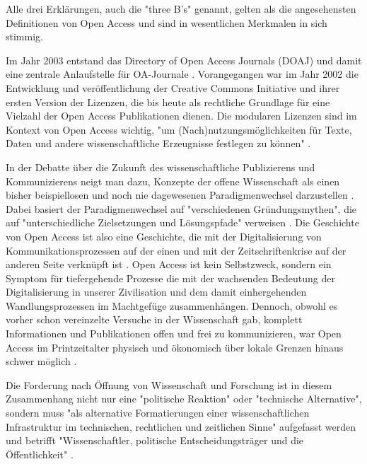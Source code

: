 Alle drei Erklärungen, auch die "three B's"\cite{suber_2004_praising_oa} genannt, gelten als die angesehensten Definitionen von Open Access und sind in wesentlichen Merkmalen in sich stimmig\cite{albert_2006_open_implications}.

Im Jahr 2003 entstand das Directory of Open Access Journals (DOAJ) und damit eine zentrale Anlaufstelle für OA-Journale \cite{suchen-Hoffmann-Zugang-undVerwertung-öffentlicher-Informationen}. Vorangegangen war im Jahr 2002 die Entwicklung und veröffentlichung der Creative Commons Initiative \cite{suchen-Hoffmann-Zugang-undVerwertung-öffentlicher-Informationen} und ihrer ersten Version der Lizenzen, die bis heute als rechtliche Grundlage für eine Vielzahl der Open Access Publikationen dienen\cite{suchen}. Die modularen Lizenzen sind im Kontext von Open Access wichtig, "um (Nach)nutzungsmöglichkeiten für Texte, Daten und andere wissenschaftliche Erzeugnisse festlegen zu können" \cite{suchen-Hoffmann-Zugang-undVerwertung-öffentlicher-Informationen}.

In der Debatte über die Zukunft des wissenschaftliche Publizierens und Kommunizierens neigt man dazu, Konzepte der offene Wissenschaft als einen bisher beispiellosen und noch nie dagewesenen Paradigmenwechsel darzustellen \cite{cite:17a} \cite{cite:17b}. Dabei basiert der Paradigmenwechsel auf "verschiedenen Gründungsmythen", die auf "unterschiedliche Zielsetzungen und Lösungspfade" verweisen \cite{suchen-Hoffmann-Zugang-undVerwertung-öffentlicher-Informationen}. Die Geschichte von Open Access ist also eine Geschichte, die mit der Digitalisierung von Kommunikationsprozessen \cite{albert_2006_open_implications} auf der einen und mit der Zeitschriftenkrise auf der anderen Seite verknüpft ist \cite{suchen-Hoffmann-Zugang-undVerwertung-öffentlicher-Informationen}. Open Access ist kein Selbstzweck\cite{cite:17d}, sondern ein Symptom für tiefergehende Prozesse die mit der wachsenden Bedeutung der Digitalisierung in unserer Zivilisation und dem damit einhergehenden Wandlungsprozessen im Machtgefüge zusammenhängen\cite{cite:17e}. Dennoch, obwohl es vorher schon vereinzelte Versuche in der Wissenschaft gab, komplett Informationen und Publikationen offen und frei zu kommunizieren, war Open Access im Printzeitalter physisch und ökonomisch über lokale Grenzen hinaus schwer möglich \cite{cite:18a}. 

Die Forderung nach Öffnung von Wissenschaft und Forschung ist in diesem Zusammenhang nicht nur eine "politische Reaktion" oder "technische Alternative", sondern muss "als alternative Formatierungen einer wissenschaftlichen Infrastruktur im technischen, rechtlichen und zeitlichen Sinne" \cite{kelty_2004} aufgefasst werden und betrifft "Wissenschaftler, politische Entscheidungsträger und die Öffentlichkeit" \cite{Scheliga_2014}.

